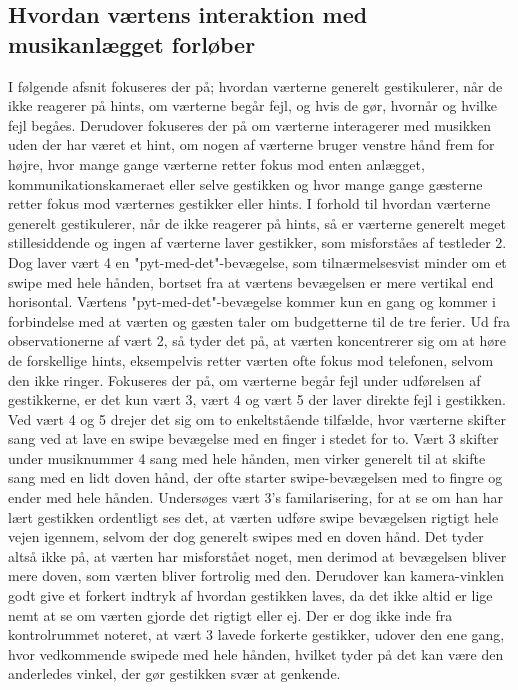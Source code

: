 \subsection{Hvordan værtens interaktion med musikanlægget forløber}
\label{TestresultaterSocialAcceptVaertsGestikker}
%
I følgende afsnit fokuseres der på; hvordan værterne generelt gestikulerer, når de ikke reagerer på hints, om værterne begår fejl, og hvis de gør, hvornår og hvilke fejl begåes. Derudover fokuseres der på om værterne interagerer med musikken uden der har været et hint, om nogen af værterne bruger venstre hånd frem for højre, hvor mange gange værterne retter fokus mod enten anlægget, kommunikationskameraet eller selve gestikken og hvor mange gange gæsterne retter fokus mod værternes gestikker eller hints.\blankline
%
I forhold til hvordan værterne generelt gestikulerer, når de ikke reagerer på hints, så er værterne generelt meget stillesiddende og ingen af værterne laver gestikker, som misforståes af testleder 2. Dog laver vært 4 en "pyt-med-det"-bevægelse, som tilnærmelsesvist minder om et swipe med hele hånden, bortset fra at værtens bevægelsen er mere vertikal end horisontal. Værtens "pyt-med-det"-bevægelse kommer kun en gang og kommer i forbindelse med at værten og gæsten taler om budgetterne til de tre ferier. Ud fra observationerne af vært 2, så tyder det på, at værten koncentrerer sig om at høre de forskellige hints, eksempelvis retter værten ofte fokus mod telefonen, selvom den ikke ringer.\blankline
%
Fokuseres der på, om værterne begår fejl under udførelsen af gestikkerne, er det kun vært 3, vært 4 og vært 5 der laver direkte fejl i gestikken. Ved vært 4 og 5 drejer det sig om to enkeltstående tilfælde, hvor værterne skifter sang ved at lave en swipe bevægelse med en finger i stedet for to. Vært 3 skifter under musiknummer 4 sang med hele hånden, men virker generelt til at skifte sang med en lidt doven hånd, der ofte starter swipe-bevægelsen med to fingre og ender med hele hånden. Undersøges vært 3's familarisering, for at se om han har lært gestikken ordentligt ses det, at værten udføre swipe bevægelsen rigtigt hele vejen igennem, selvom der dog generelt swipes med en doven hånd. Det tyder altså ikke på, at værten har misforstået noget, men derimod at bevægelsen bliver mere doven, som værten bliver fortrolig med den. Derudover kan kamera-vinklen godt give et forkert indtryk af hvordan gestikken laves, da det ikke altid er lige nemt at se om værten gjorde det rigtigt eller ej. Der er dog ikke inde fra kontrolrummet noteret, at vært 3 lavede forkerte gestikker, udover den ene gang, hvor vedkommende swipede med hele hånden, hvilket tyder på det kan være den anderledes vinkel, der gør gestikken svær at genkende. 

